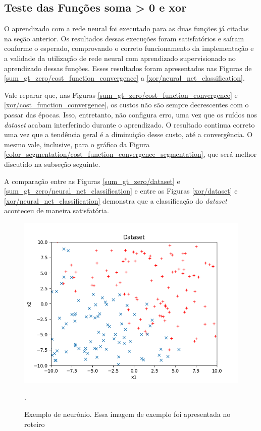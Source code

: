 \documentclass[conference]{IEEEtran}
\begin{document}
\subsection{Teste das Funções soma > 0 e xor}

O aprendizado com a rede neural foi executado para as duas funções já citadas na seção anterior. Os resultados dessas execuções foram satisfatórios e saíram conforme o esperado, comprovando o correto funcionamento da implementação e a validade da utilização de rede neural com aprendizado supervisionado no aprendizado dessas funções. Esses resultados foram apresentados nas Figuras de \ref{sum_gt_zero/cost_function_convergence} a \ref{xor/neural_net_classification}.

Vale reparar que, nas Figuras \ref{sum_gt_zero/cost_function_convergence} e \ref{xor/cost_function_convergence}, os custos não são sempre decrescentes com o passar das épocas. Isso, entretanto, não configura erro, uma vez que os ruídos nos \textit{dataset} acabam interferindo durante o aprendizado. O resultado continua correto uma vez que a tendência geral é a diminuição desse custo, até a convergência. O mesmo vale, inclusive, para o gráfico da Figura \ref{color_segmentation/cost_function_convergence_segmentation}, que será melhor discutido na subseção seguinte.

A comparação entre as Figuras \ref{sum_gt_zero/dataset} e \ref{sum_gt_zero/neural_net_classification} e entre as Figuras \ref{xor/dataset} e \ref{xor/neural_net_classification} demonstra que a classificação do \textit{dataset} aconteceu de maneira satisfatória.

\begin{figure}[htbp]
\centering
\centerline{\includegraphics[scale=0.5]{imagens/sum_gt_zero/lambda_zero/dataset_sgz.png}}
\caption{Exemplo de neurônio. Essa imagem de exemplo foi apresentada no roteiro \cite{roteiro}}.
\label{sum_gt_zero/lambda_zero/dataset_sgz}
\end{figure}
\end{document}
